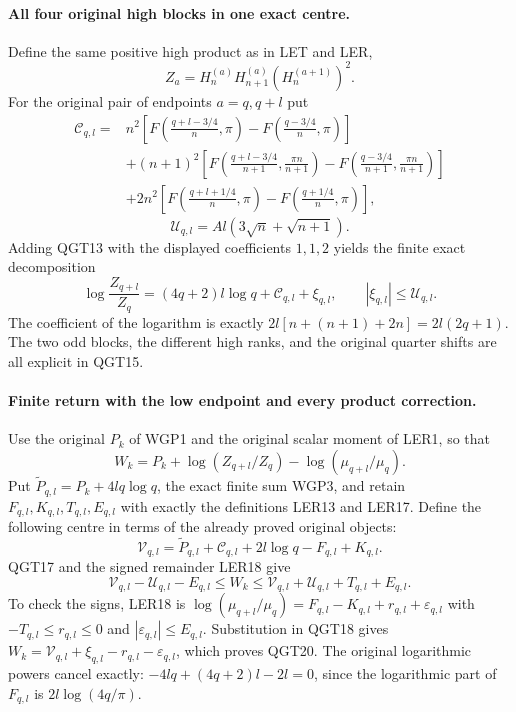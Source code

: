 \paragraph{All four original high blocks in one exact centre.}
Define the same positive high product as in LET and LER,
\[
 Z_a=H_n^{(a)}H_{n+1}^{(a)}(H_n^{(a+1)})^2.
\]
For the original pair of endpoints $a=q,q+l$ put
\[
\begin{split}
 \mathcal C_{q,l}={}&n^2\left[
 F\left(\frac{q+l-3/4}{n},\pi\right)
 -F\left(\frac{q-3/4}{n},\pi\right)\right]\\
 &+(n+1)^2\left[
 F\left(\frac{q+l-3/4}{n+1},\frac{\pi n}{n+1}\right)
 -F\left(\frac{q-3/4}{n+1},\frac{\pi n}{n+1}\right)\right]\\
 &+2n^2\left[
 F\left(\frac{q+l+1/4}{n},\pi\right)
 -F\left(\frac{q+1/4}{n},\pi\right)\right],
\end{split}
 \tag{QGT15}
\]
\[
 \mathcal U_{q,l}=Al(3\sqrt n+\sqrt{n+1}).
 \tag{QGT16}
\]
Adding QGT13 with the displayed coefficients $1,1,2$ yields the
finite exact decomposition
\[
 \boxed{\log\frac{Z_{q+l}}{Z_q}
       =(4q+2)l\log q+\mathcal C_{q,l}+\xi_{q,l},
              \qquad |\xi_{q,l}|\le\mathcal U_{q,l}.}
 \tag{QGT17}
\]
The coefficient of the logarithm is exactly
$2l[n+(n+1)+2n]=2l(2q+1)$. The two odd blocks, the different
high ranks, and the original quarter shifts are all explicit in QGT15.

\paragraph{Finite return with the low endpoint and every product correction.}
Use the original $P_k$ of WGP1 and the original scalar moment of LER1,
so that
\[
 W_k=P_k+\log(Z_{q+l}/Z_q)-\log(\mu_{q+l}/\mu_q).
 \tag{QGT18}
\]
Put $\widetilde P_{q,l}=P_k+4lq\log q$, the exact finite sum WGP3,
and retain $F_{q,l},K_{q,l},T_{q,l},E_{q,l}$ with exactly the
definitions LER13 and LER17. Define the following centre in terms of
the already proved original objects:
\[
 \mathcal V_{q,l}=\widetilde P_{q,l}+\mathcal C_{q,l}
                         +2l\log q-F_{q,l}+K_{q,l}.
 \tag{QGT19}
\]
QGT17 and the signed remainder LER18 give
\[
 \boxed{\mathcal V_{q,l}-\mathcal U_{q,l}-E_{q,l}
       \le W_k\le
       \mathcal V_{q,l}+\mathcal U_{q,l}+T_{q,l}+E_{q,l}.}
 \tag{QGT20}
\]
To check the signs, LER18 is
$\log(\mu_{q+l}/\mu_q)=F_{q,l}-K_{q,l}+r_{q,l}+\varepsilon_{q,l}$
with $-T_{q,l}\le r_{q,l}\le0$ and
$|\varepsilon_{q,l}|\le E_{q,l}$. Substitution in QGT18 gives
$W_k=\mathcal V_{q,l}+\xi_{q,l}-r_{q,l}-\varepsilon_{q,l}$,
which proves QGT20. The original logarithmic powers cancel exactly:
$-4lq+(4q+2)l-2l=0$, since the logarithmic part of $F_{q,l}$ is
$2l\log(4q/\pi)$.

